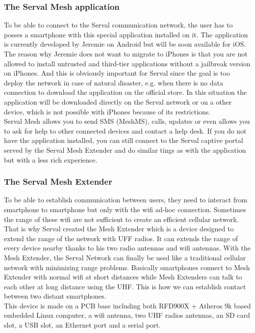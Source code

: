 \subsubsection{The Serval Mesh application}
To be able to connect to the Serval communication network, the user has to posses a smartphone with this special application installed on it. The application is currently developed by Jeremie on Android but will be soon available for iOS. The reason why Jeremie does not want to migrate to iPhones is that you are not allowed to install untrusted and third-tier applications without a jailbreak version on iPhones. And this is obviously important for Serval since the goal is too deploy the network in case of natural disaster, e.g. when there is no data connection to download the application on the official store. In this situation the application will be downloaded directly on the Serval network or on a other device, which is not possible with iPhones because of its restrictions. \\
Serval Mesh allows you to send SMS (MeshMS), calls, updates or even allows you to ask for help to other connected devices and contact a help desk. If you do not have the application installed, you can still connect to the Serval captive portal served by the Serval Mesh Extender and do similar tings as with the application but with a less rich experience.

\subsubsection{The Serval Mesh Extender}
To be able to establish communication between users, they need to interact from smartphone to smartphone but only with the wifi ad-hoc connection. Sometimes the range of these wifi are not sufficient to create an efficient cellular network. That is why Serval created the Mesh Extender which is a device designed to extend the range of the network with UFF radios. It can extends the range of every device nearby thanks to his two radio antennas and wifi antennas. With the Mesh Extender, the Serval Network can finally be used like a traditional cellular network with minimizing range problems. Basically smartphones connect to Mesh Extender with normal wifi at short distances while Mesh Extenders can talk to each other at long distance using the UHF. This is how we can establish contact between two distant smartphones. \\
This device is made on a PCB base including both RFD900X + Atheros 9k based embedded Linux computer, a wifi antenna, two UHF radios antennas, an SD card slot, a USB slot, an Ethernet port and a serial port. 

